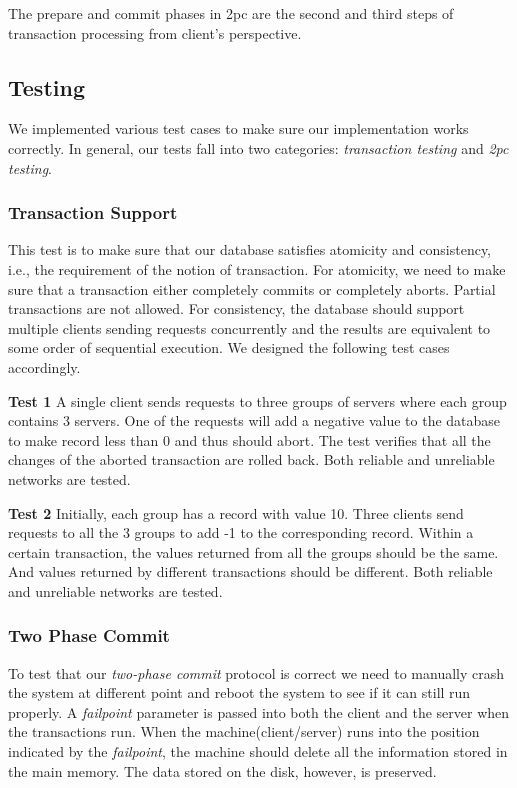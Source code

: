 \documentclass{vldb}
\begin{document}
The prepare and commit phases in 2pc are the second and third steps of 
transaction processing from client's perspective.

\subsection{Testing}

We implemented various test cases to make sure our implementation 
works correctly. In general, our tests fall into two categories: 
\textit{transaction testing} and \textit{2pc testing}. 

\subsubsection{Transaction Support}

This test is to make sure that our database satisfies atomicity and 
consistency, i.e., the requirement of the notion of transaction. For 
atomicity, we need to make sure that a transaction either completely 
commits or completely aborts. Partial transactions are not allowed.  
For consistency, the database should support multiple clients sending 
requests concurrently and the results are equivalent to some order of 
sequential execution. We designed the following test cases 
accordingly.

\textbf{Test 1} A single client sends requests to three groups of servers where each
group contains 3 servers. One of the requests will add a negative value to the
database to make record less than 0 and thus should abort. The test verifies that all
the changes of the aborted transaction are rolled back. Both reliable and unreliable
networks are tested.

\textbf{Test 2} Initially, each group has a record with value 10.  Three clients send
requests to all the 3 groups to add -1 to the corresponding record. Within a certain
transaction, the values returned from all the groups should be the same. And values
returned by different transactions should be different. Both reliable and unreliable
networks are tested.

\subsubsection{Two Phase Commit}

To test that our \textit{two-phase commit} protocol is correct we need to manually
crash the system at different point and reboot the system to see if it can still run
properly. A \textit{failpoint} parameter is passed into both the client and the
server when the transactions run.  When the machine(client/server) runs into the
position indicated by the \textit{failpoint}, the machine should delete all the
information stored in the main memory. The data stored on the disk, however, is
preserved.
\end{document}
